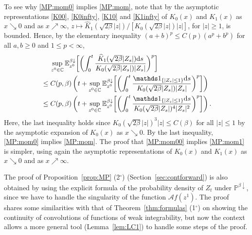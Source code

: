 \documentclass[12pt, twoside]{article}
\numberwithin{figure}{section}
\newcommand{\1}{\mathds 1}
\newcommand{\da}{{\downarrow}}
\newcommand{\ms}{\mathscr}
\renewcommand{\P}{{\mathbb P}}
\newcommand{\E}{{\mathbb E}}
\renewcommand{\d}{{\mathrm d}}
\newcommand{\2}{{\mathbf 1}}
\newcommand{\cc}{{^\circ}}
\newcommand{\hK}{{\widehat{K}}}
\begin{document}
To see why \eqref{MP:mom0} implies \eqref{MP:mom}, note that by the asymptotic representations \eqref{K00}, \eqref{K0infty}, \eqref{K10} and \eqref{K1infty} of $K_0(x)$ and $K_1(x)$ as $x\searrow 0$ and as $x\nearrow\infty$, $z\mapsto \widehat{K}_1(\sqrt{2\beta}|z|)/[K_0(\sqrt{2\beta}|z|)|z|]$, for $|z|\geq 1$, is bounded. Hence, by the elementary inequality $(a+b)^p\leq C(p)(a^p+b^p)$ for all $a,b\geq 0$ and $1\leq p<\infty$,
 \begin{align*}
 &\quad\;\sup_{z^0\in \Bbb C}\E^{\beta\da}_{z^0}\biggl[\biggl(\int_0^t\frac{\hK_1(\sqrt{2\beta}|Z_s|)\d s}{K_0(\sqrt{2\beta}|Z_s|)|Z_s|}\biggr)^p
\biggr]\notag\\
&\leq C(p,\beta)\left(t+  \sup_{z^0\in \Bbb C}\E^{\beta\da}_{z^0}\biggl[\biggl(\int_0^t\frac{\1_{\{|Z_s|\leq 1\}}\d s}{K_0(\sqrt{2\beta}|Z_s|)|Z_s|}\biggr)^p
\biggr]\right)\\
&\leq C(p,\beta)\left(t+  \sup_{z^0\in \Bbb C}\E^{\beta\da}_{z^0}\biggl[\biggl(\int_0^t \frac{\1_{\{|Z_s|\leq 1\}}\d s}{K_0(\sqrt{2\beta}|Z_s|)^4|Z_s|^2}\biggr)^p\biggr]\right).
\end{align*}
Here, the last inequality holds since $K_0(\sqrt{2\beta}|z|)^3 |z|\leq C(\beta) $ for all $|z|\leq1$ by the asymptotic expansion of $K_0(x)$ as $x\searrow 0$. By the last inequality, \eqref{MP:mom0} implies \eqref{MP:mom}. The proof that \eqref{MP:mom00} implies \eqref{MP:mom1} is simpler, using again the asymptotic representations of $K_0(x)$ and $K_1(x)$ as $x\searrow 0$ and as $x\nearrow\infty$.  

The proof of Proposition~\ref{prop:MP} (2$\cc$) (Section~\ref{sec:contforward}) is also obtained by using 
the explicit formula of the probability density of $Z_t$ under $\P^{\beta\da}$, since we have to handle the singularity of the function $\ms Af(z^1)$. The proof shares some similarities with that of Theorem~\ref{thm:formulas} (1$\cc$) on showing the continuity of convolutions of functions of weak integrability, but now the context allows a more general tool (Lemma~\ref{lem:LC1}) to handle some steps of the proof. 
\end{document}
